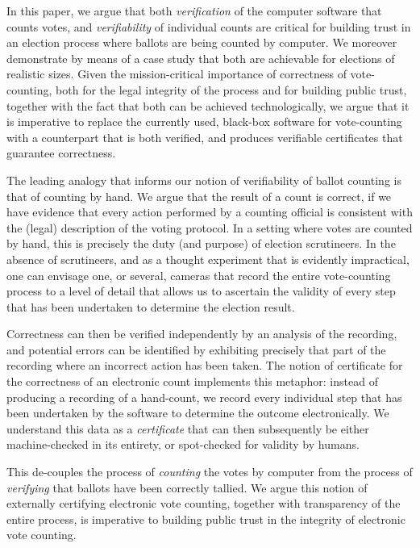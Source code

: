 \documentclass{llncs}
\begin{document}
In this paper, we argue that both \emph{verification} of the
computer software that counts votes, and
\emph{verifiability} of individual counts are critical for
building trust in an election process where ballots are being
counted by computer. We moreover demonstrate by means of a case
study that both are achievable for elections of realistic sizes.
Given the mission-critical importance of correctness of vote-counting,
both for the legal integrity of the process and for
building public trust, together with the fact that both can be achieved
technologically, we argue that it is imperative to replace the
currently used, black-box software for vote-counting with a
counterpart that is both verified, and produces verifiable
certificates that guarantee correctness.

The leading analogy that informs our notion of verifiability of
ballot counting is that of counting by hand. We argue that the
result of a count is correct, if we have evidence that every action
performed by a counting official is consistent with the (legal)
description of the voting protocol. In a setting where votes are
counted by hand, this is precisely the duty (and purpose) of
election scrutineers. In the absence of scrutineers, and as a
thought experiment that is evidently impractical, one can envisage one, or several, cameras
that record the entire vote-counting process to a level of
detail that allows us to ascertain the validity of every step that
has been undertaken to determine the election result. 

Correctness can then be verified independently by an analysis of the
recording, and potential errors can be identified by exhibiting
precisely that part of the recording where an incorrect action has
been taken. The notion of certificate for the correctness of an
electronic count implements this metaphor: instead of
producing a recording of a hand-count, we record every individual
step that has been undertaken by the software to determine the
outcome electronically.  We understand this data as  a
\emph{certificate} 
that can then 
subsequently be either machine-checked in its entirety, or
spot-checked for validity by humans.  

This de-couples the process of \emph{counting} the votes by computer
from the process of \emph{verifying} that ballots have been
correctly tallied. We argue this notion of externally certifying
electronic vote counting, together with transparency of the entire
process,  is imperative to building public trust in
the integrity of electronic vote counting.
\end{document}
